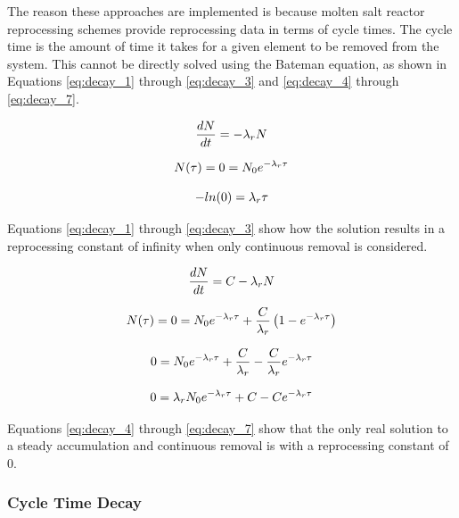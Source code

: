 The reason these approaches are implemented is because molten salt reactor reprocessing schemes provide reprocessing data in terms of cycle times. The cycle time is the amount of time it takes for a given element to be removed from the system. This cannot be directly solved using the Bateman equation, as shown in Equations \eqref{eq:decay_1} through \eqref{eq:decay_3} and \eqref{eq:decay_4} through \eqref{eq:decay_7}. 

\begin{equation} \hfill
\frac{dN}{dt} = -\lambda_r N
\hfill\label{eq:decay_1} \end{equation}

\begin{equation} \hfill
N(\tau) = 0 = N_0 e^{-\lambda_r \tau}
\hfill\label{eq:decay_2} \end{equation}

\begin{equation} \hfill
-ln(0) = \lambda_r \tau
\hfill\label{eq:decay_3} \end{equation}

Equations \eqref{eq:decay_1} through \eqref{eq:decay_3} show how the solution results in a reprocessing constant of infinity when only continuous removal is considered.

\begin{equation} \hfill
\frac{dN}{dt} = C -\lambda_r N
\hfill\label{eq:decay_4} \end{equation}

\begin{equation} \hfill
N(\tau) = 0 = N_0 e^{-\lambda_r \tau} + \frac{C}{\lambda_r} \left( 1 - e^{-\lambda_r \tau} \right)
\hfill\label{eq:decay_5} \end{equation}

\begin{equation} \hfill
0 = N_0 e^{-\lambda_r \tau} + \frac{C}{\lambda_r} - \frac{C}{\lambda_r} e^{-\lambda_r \tau}
\hfill\label{eq:decay_6} \end{equation}

\begin{equation} \hfill
0 = \lambda_r N_0 e^{-\lambda_r \tau} + C - C e^{-\lambda_r \tau}
\hfill\label{eq:decay_7} \end{equation}


 Equations \eqref{eq:decay_4} through \eqref{eq:decay_7} show that the only real solution to a steady accumulation and continuous removal is with a reprocessing constant of 0. 

\subsubsection{Cycle Time Decay}

